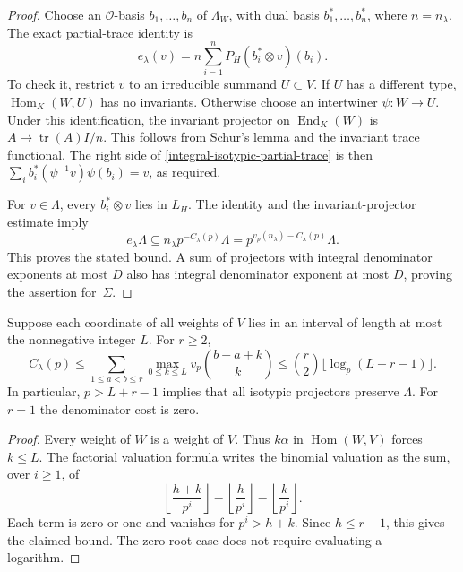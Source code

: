 \begin{proof}
Choose an $\mathcal O$-basis $b_1,\ldots,b_n$ of $\Lambda_W$, with
dual basis $b_1^*,\ldots,b_n^*$, where $n=n_\lambda$.  The exact
partial-trace identity is
\begin{equation}\label{integral-isotypic-partial-trace}
 e_\lambda(v)=n\sum_{i=1}^nP_H(b_i^*\otimes v)(b_i).
\end{equation}
To check it, restrict $v$ to an irreducible summand $U\subset V$.
If $U$ has a different type, $\operatorname{Hom}_K(W,U)$ has no
invariants.  Otherwise choose an intertwiner $\psi:W\to U$.
Under this identification, the invariant projector on
$\operatorname{End}_K(W)$ is $A\mapsto\operatorname{tr}(A)I/n$.
This follows from Schur's lemma and the invariant trace functional.
The right side of \eqref{integral-isotypic-partial-trace} is then
$\sum_i b_i^*(\psi^{-1}v)\psi(b_i)=v$, as required.

For $v\in\Lambda$, every $b_i^*\otimes v$ lies in $L_H$.
The identity and the invariant-projector estimate imply
\[
 e_\lambda\Lambda
       \subseteq n_\lambda p^{-C_\lambda(p)}\Lambda
       =p^{v_p(n_\lambda)-C_\lambda(p)}\Lambda.
\]
This proves the stated bound.  A sum of projectors with integral
denominator exponents at most $D$ also has integral denominator
exponent at most $D$, proving the assertion for~$\Sigma$.
\end{proof}

\begin{corollary}
\label{integral-isotypic-width-bound}
Suppose each coordinate of all weights of $V$ lies in an interval
of length at most the nonnegative integer $L$.  For $r\ge2$,
\[
 C_\lambda(p)
 \le\sum_{1\le a<b\le r}\max_{0\le k\le L}
                   v_p\binom{b-a+k}{k}
 \le\binom r2\lfloor\log_p(L+r-1)\rfloor.
\]
In particular, $p>L+r-1$ implies that all isotypic projectors
preserve $\Lambda$.  For $r=1$ the denominator cost is zero.
\end{corollary}

\begin{proof}
Every weight of $W$ is a weight of $V$.  Thus $k\alpha$ in
$\operatorname{Hom}(W,V)$ forces $k\le L$.  The factorial valuation
formula writes the binomial valuation as the sum, over $i\ge1$, of
\[
 \left\lfloor\frac{h+k}{p^i}\right\rfloor
 -\left\lfloor\frac h{p^i}\right\rfloor
 -\left\lfloor\frac k{p^i}\right\rfloor.
\]
Each term is zero or one and vanishes for $p^i>h+k$.  Since
$h\le r-1$, this gives the claimed bound.  The zero-root case
does not require evaluating a logarithm.
\end{proof}

